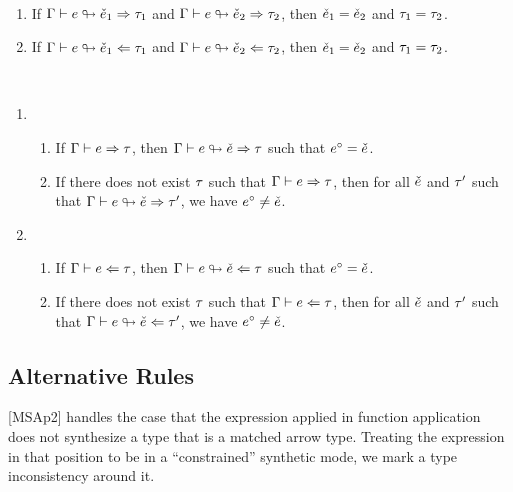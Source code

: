 \documentclass{article}
\begin{document}
\begin{theorem}[name=Unicity] \
  \begin{enumerate}
    \item If $\Gamma \vdash e \looparrowright \check{e}_1 \Rightarrow \tau_1$ and
      $\Gamma \vdash e \looparrowright \check{e}_2 \Rightarrow \tau_2$, then $\check{e}_1 = \check{e}_2$ and $\tau_1 =
      \tau_2$.
    \item If $\Gamma \vdash e \looparrowright \check{e}_1 \Leftarrow \tau_1$ and
      $\Gamma \vdash e \looparrowright \check{e}_2 \Leftarrow \tau_2$, then $\check{e}_1 = \check{e}_2$ and $\tau_1 =
      \tau_2$.
  \end{enumerate}
\end{theorem}

\begin{theorem}[name=?] \
  \begin{enumerate}
    \item \begin{enumerate}
        \item If $\Gamma \vdash e \Rightarrow \tau$, then $\Gamma \vdash e \looparrowright \check{e} \Rightarrow \tau$
          such that $e^{\circ} = \check{e}$.
        \item If there does not exist $\tau$ such that $\Gamma \vdash e \Rightarrow \tau$, then for all
          $\check{e}$ and $\tau'$ such that $\Gamma \vdash e \looparrowright \check{e} \Rightarrow \tau'$, we have
          $e^{\circ} \neq \check{e}$.
      \end{enumerate}

    \item \begin{enumerate}
        \item If $\Gamma \vdash e \Leftarrow \tau$, then $\Gamma \vdash e \looparrowright \check{e} \Leftarrow \tau$
          such that $e^{\circ} = \check{e}$.
        \item If there does not exist $\tau$ such that $\Gamma \vdash e \Leftarrow \tau$, then for all
          $\check{e}$ and $\tau'$ such that $\Gamma \vdash e \looparrowright \check{e} \Leftarrow \tau'$, we have
          $e^{\circ} \neq \check{e}$.
      \end{enumerate}
  \end{enumerate}
\end{theorem}

\subsection{Alternative Rules}
[MSAp2] handles the case that the expression applied in function application does not synthesize a
type that is a matched arrow type. Treating the expression in that position to be in a
``constrained'' synthetic mode, we mark a type inconsistency around it.
\end{document}

